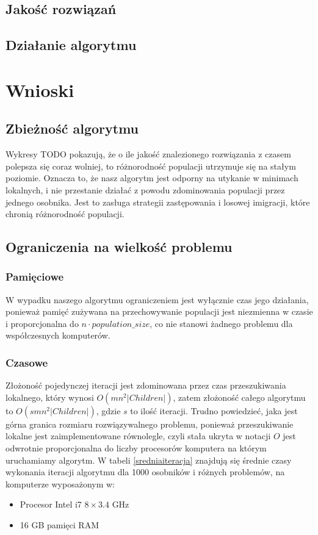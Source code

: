 \documentclass[11pt, a4wide]{article}
\begin{document}
\subsection{Jakość rozwiązań}
\subsection{Działanie algorytmu}


\section{Wnioski}  
\subsection{Zbieżność algorytmu}
Wykresy TODO pokazują, że o ile jakość znalezionego rozwiązania z czasem polepsza się coraz wolniej, to
różnorodność populacji utrzymuje się na stałym poziomie. Oznacza to, że nasz algorytm jest odporny na utykanie
w minimach lokalnych, i nie przestanie działać z powodu zdominowania populacji przez jednego osobnika. Jest to
zasługa strategii zastępowania i losowej imigracji, które chronią różnorodność populacji.

\subsection{Ograniczenia na wielkość problemu}
\subsubsection{Pamięciowe}
W wypadku naszego algorytmu ograniczeniem jest wyłącznie czas jego działania, ponieważ
pamięć zużywana na przechowywanie populacji jest niezmienna w czasie i proporcjonalna do
$n \cdot population\_size$, co nie stanowi żadnego problemu dla współczesnych komputerów.
\subsubsection{Czasowe}
Złożoność pojedynczej iteracji jest zdominowana przez czas przeszukiwania lokalnego, który wynosi
$O(mn^2|Children|)$, zatem złożoność całego algorytmu to $O(smn^2|Children|)$, gdzie $s$ to ilość iteracji.
Trudno powiedzieć, jaka jest górna granica rozmiaru rozwiązywalnego problemu, ponieważ przeszukiwanie 
lokalne jest zaimplementowane równolegle, czyli stała ukryta w notacji $O$ jest odwrotnie proporcjonalna
do liczby procesorów komputera na którym uruchamiamy algorytm. W tabeli \ref{sredniaiteracja} znajdują się 
średnie czasy wykonania iteracji algorytmu dla 1000 osobników i różnych problemów, na komputerze wyposażonym w:
\begin{itemize}
  \item Procesor Intel i7 $8 \times \text{3.4 GHz}$
  \item 16 GB pamięci RAM
\end{itemize}
\end{document}
